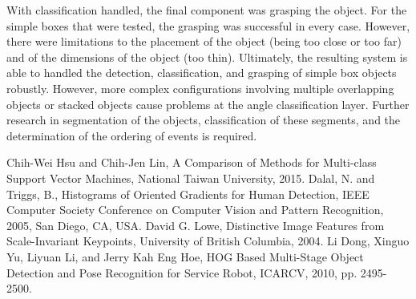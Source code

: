 \documentclass[letterpaper, 10 pt, conference]{conf/ieeeconf}  %
\begin{document}
With classification handled, the final component was grasping the object. For
the simple boxes that were tested, the grasping was successful in every case.
However, there were limitations to the placement of the object (being too close
or too far) and of the dimensions of the object (too thin). Ultimately, the
resulting system is able to handled the detection, classification, and grasping
of simple box objects robustly. However, more complex configurations involving
multiple overlapping objects or stacked objects cause problems at the angle
classification layer. Further research in segmentation of the objects,
classification of these segments, and the determination of the ordering of
events is required.





\addtolength{\textheight}{-12cm}   %




\begin{thebibliography}{99}

 Chih-Wei Hsu and Chih-Jen Lin, A Comparison of Methods for
  Multi-class Support Vector Machines, National Taiwan University, 2015.
 Dalal, N. and Triggs, B., Histograms of Oriented Gradients
  for Human Detection, IEEE Computer Society Conference on Computer Vision and
  Pattern Recognition, 2005, San Diego, CA, USA.
 David G. Lowe, Distinctive Image Features from
  Scale-Invariant Keypoints, University of British Columbia, 2004.
 Li Dong, Xinguo Yu, Liyuan Li, and Jerry Kah Eng Hoe, HOG Based
  Multi-Stage Object Detection and Pose Recognition for Service Robot, ICARCV,
  2010, pp. 2495-2500.
\end{thebibliography}
\end{document}
